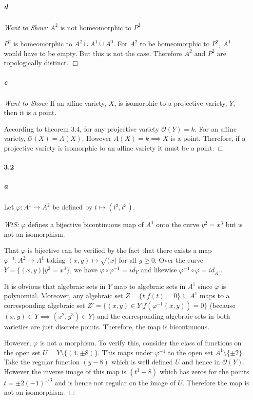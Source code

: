\documentclass{article}
\begin{document}
\subparagraph{d}
\emph{Want to Show:} $A^2$ is not homeomorphic to $P^2$

$P^2$ is homeomorphic to $A^2 \dot{\cup} A^1 \dot{\cup} A^0$.  For $A^2$ to be homeomorphic to $P^2$, $A^1$ would have to be empty.  But this is not the case.  Therefore $A^2$ and $P^2$ are topologically distinct. $\Box$

\subparagraph{e}
\emph{Want to Show:} If an affine variety, $X$, is isomorphic to a projective variety, $Y$, then it is a point.

According to theorem 3.4, for any projective variety $\mathcal{O}(Y) = k$.  For an affine variety, $\mathcal{O}(X) = A(X)$.  However $A(X) = k \implies X$ is a point.  Therefore, if a projective variety is isomorphic to an affine variety it must be a point. $\Box$

\paragraph{3.2}

\subparagraph{a} Let $\varphi : A^1 \to A^2$ be defined by $t \mapsto (t^2, t^3)$.  

\emph{WtS:} $\varphi$ defines a bijective bicontinuous map of $A^1$ onto the curve $y^2 = x^3$ but is not an isomorphism.

That $\varphi$ is bijective can be verified by the fact that there exists a map $\varphi^{-1} : A^2 \to A^1$ taking $(x,y) \mapsto \sqrt(x)$ for all $y \geq 0$.  Over the curve $Y = \{ (x,y) | y^2 = x^3 \}$, we have $\varphi \circ \varphi^{-1} = id_{Y}$ and likewise $\varphi^{-1} \circ \varphi = id_{A^1}$.  

It is obvious that algebraic sets in $Y$ map to algebraic sets in $A^1$ since $\varphi$ is polynomial.  Moreover, any algebraic set $Z = \{ t | f(t) = 0 \} \subseteq A^1$ maps to a corresponding algebraic set $Z' = \{ (x,y) \in Y | f(\varphi^{-1}(x,y)) = 0 \}$ (because $(x,y) \in Y \implies (x^2, y^3) \in Y$) and the corresponding algebraic sets in both varieties are just discrete points.  Therefore, the map is bicontinuous.

However, $\varphi$ is not a morphism.  To verify this, consider the class of functions on the open set $U = Y \setminus \{ (4, \pm 8) \}$.  This maps under $\varphi^{-1}$ to the open set $A^1 \setminus \{ \pm 2 \}$.  Take the regular function $(y - 8)$ which is well defined $U$ and hence in $\mathcal{O}(Y)$.  However the inverse image of this map is $(t^3 - 8)$ which has zeros for the points $t = \pm 2 (-1)^{1/3}$ and is hence not regular on the image of $U$.  Therefore the map is not an isomorphism. $\Box$
\end{document}

